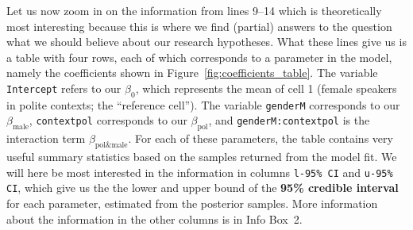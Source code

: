 \documentclass[nobib]{tufte-handout}
\begin{document}
Let us now zoom in on the information from lines 9--14 which is theoretically most interesting because this is where we find (partial) answers to the question what we should believe about our research hypotheses. What these lines give us is a table with four rows, each of which corresponds to a parameter in the model, namely the coefficients shown in Figure~\ref{fig:coefficients_table}. The variable \texttt{Intercept} refers to our $\beta_0$, which represents the mean of cell 1 (female speakers in polite contexts; the ``reference cell''). The variable \texttt{genderM} corresponds to our $\beta_{\text{male}}$, \texttt{contextpol} corresponds to our $\beta_{\text{pol}}$, and \texttt{genderM:contextpol} is the interaction term $\beta_{\text{pol\&male}}$. For each of these parameters, the table contains very useful summary statistics based on the samples returned from the model fit. We will here be most interested in the information in columns \texttt{l-95\% CI} and \texttt{u-95\% CI}, which give us the the lower and upper bound of the \textbf{95\% credible interval} for each parameter, estimated from the posterior samples.
%
%
More information about the information in the other columns is in Info Box~2.
\end{document}
